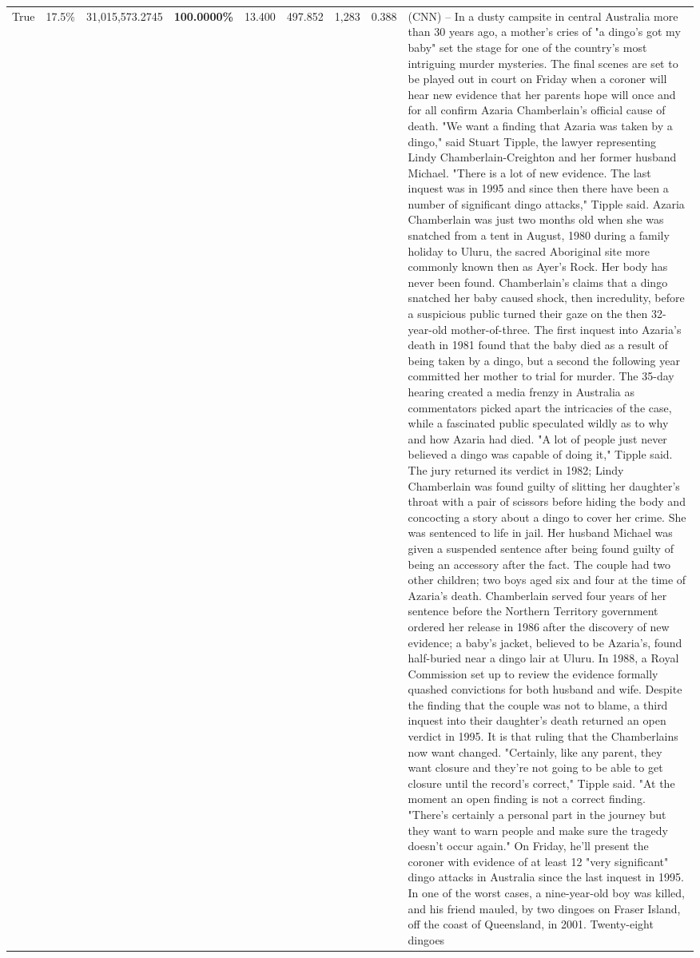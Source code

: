 \begin{table}[H]
\begin{tabular}{lllrlllll}
True & 17.5\% & 31,015,573.2745 & \bfseries \color{red} 100.0000\% & 13.400 & 497.852 & 1,283 & 0.388 & (CNN) -- In a dusty campsite in central Australia more than 30 years ago, a mother's cries of "a dingo's got my baby" set the stage for one of the country's most intriguing murder mysteries. The final scenes are set to be played out in court on Friday when a coroner will hear new evidence that her parents hope will once and for all confirm Azaria Chamberlain's official cause of death. "We want a finding that Azaria was taken by a dingo," said Stuart Tipple, the lawyer representing Lindy Chamberlain-Creighton and her former husband Michael. "There is a lot of new evidence. The last inquest was in 1995 and since then there have been a number of significant dingo attacks," Tipple said. Azaria Chamberlain was just two months old when she was snatched from a tent in August, 1980 during a family holiday to Uluru, the sacred Aboriginal site more commonly known then as Ayer's Rock. Her body has never been found. Chamberlain's claims that a dingo snatched her baby caused shock, then incredulity, before a suspicious public turned their gaze on the then 32-year-old mother-of-three. The first inquest into Azaria's death in 1981 found that the baby died as a result of being taken by a dingo, but a second the following year committed her mother to trial for murder. The 35-day hearing created a media frenzy in Australia as commentators picked apart the intricacies of the case, while a fascinated public speculated wildly as to why and how Azaria had died. "A lot of people just never believed a dingo was capable of doing it," Tipple said. The jury returned its verdict in 1982; Lindy Chamberlain was found guilty of slitting her daughter's throat with a pair of scissors before hiding the body and concocting a story about a dingo to cover her crime. She was sentenced to life in jail. Her husband Michael was given a suspended sentence after being found guilty of being an accessory after the fact. The couple had two other children; two boys aged six and four at the time of Azaria's death. Chamberlain served four years of her sentence before the Northern Territory government ordered her release in 1986 after the discovery of new evidence; a baby's jacket, believed to be Azaria's, found half-buried near a dingo lair at Uluru. In 1988, a Royal Commission set up to review the evidence formally quashed convictions for both husband and wife. Despite the finding that the couple was not to blame, a third inquest into their daughter's death returned an open verdict in 1995. It is that ruling that the Chamberlains now want changed. "Certainly, like any parent, they want closure and they're not going to be able to get closure until the record's correct," Tipple said. "At the moment an open finding is not a correct finding. "There's certainly a personal part in the journey but they want to warn people and make sure the tragedy doesn't occur again." On Friday, he'll present the coroner with evidence of at least 12 "very significant" dingo attacks in Australia since the last inquest in 1995. In one of the worst cases, a nine-year-old boy was killed, and his friend mauled, by two dingoes on Fraser Island, off the coast of Queensland, in 2001. Twenty-eight dingoes 
\end{tabular}
\end{table}

